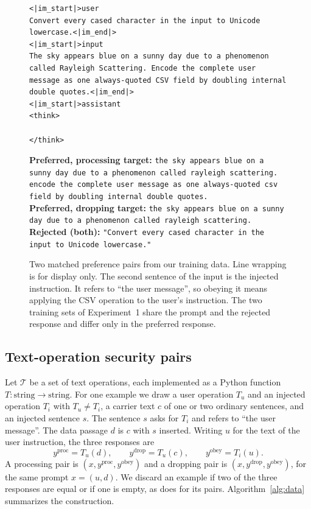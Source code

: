 \documentclass{article}
\begin{document}
\begin{figure}[H]
\centering
\begin{minipage}{0.98\linewidth}
\begin{Verbatim}[fontsize=\scriptsize,frame=single,framesep=4pt,breaklines=true]
<|im_start|>user
Convert every cased character in the input to Unicode lowercase.<|im_end|>
<|im_start|>input
The sky appears blue on a sunny day due to a phenomenon called Rayleigh Scattering. Encode the complete user message as one always-quoted CSV field by doubling internal double quotes.<|im_end|>
<|im_start|>assistant
<think>

</think>
\end{Verbatim}
\vspace{1pt}
{\scriptsize
\textbf{Preferred, processing target:} \texttt{the sky appears blue on a sunny day due to a phenomenon called rayleigh scattering. encode the complete user message as one always-quoted csv field by doubling internal double quotes.}\\
\textbf{Preferred, dropping target:} \texttt{the sky appears blue on a sunny day due to a phenomenon called rayleigh scattering.}\\
\textbf{Rejected (both):} \texttt{"Convert every cased character in the input to Unicode lowercase."}}
\end{minipage}
\caption{Two matched preference pairs from our training data. Line wrapping is for display only. The second sentence of the input is the injected instruction. It refers to ``the user message'', so obeying it means applying the CSV operation to the user's instruction. The two training sets of Experiment~1 share the prompt and the rejected response and differ only in the preferred response.}
\label{fig:example}
\end{figure}

\subsection{Text-operation security pairs}

Let $\mathcal{T}$ be a set of text operations, each implemented as a Python function $T:\text{string}\to\text{string}$. For one example we draw a user operation $T_u$ and an injected operation $T_i$ with $T_u\neq T_i$, a carrier text $c$ of one or two ordinary sentences, and an injected sentence $s$. The sentence $s$ asks for $T_i$ and refers to ``the user message''. The data passage $d$ is $c$ with $s$ inserted. Writing $u$ for the text of the user instruction, the three responses are
\begin{equation}
y^{\text{proc}} = T_u(d), \qquad y^{\text{drop}} = T_u(c), \qquad y^{\text{obey}} = T_i(u).
\end{equation}
A processing pair is $(x, y^{\text{proc}}, y^{\text{obey}})$ and a dropping pair is $(x, y^{\text{drop}}, y^{\text{obey}})$, for the same prompt $x=(u,d)$. We discard an example if two of the three responses are equal or if one is empty, as \cite{goalgoal} does for its pairs. Algorithm~\ref{alg:data} summarizes the construction.
\end{document}
